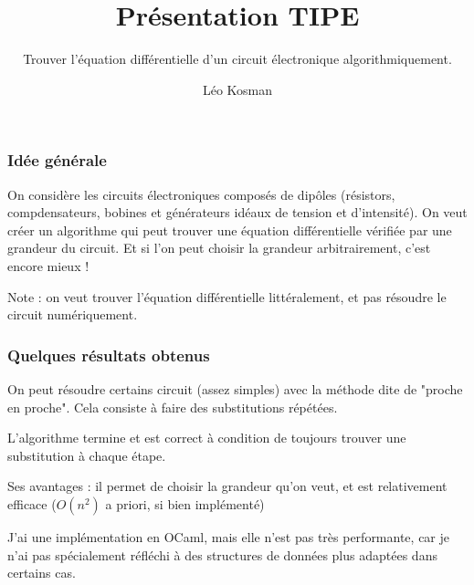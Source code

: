 \documentclass{beamer}
\title{Présentation TIPE}
\subtitle{Trouver l'équation différentielle d'un circuit électronique
algorithmiquement.}
\author{Léo Kosman}
\institute{MP2I \textemdash{} Lycée Thiers}
\date{}
\begin{document}
    \begin{frame}
        \titlepage
    \end{frame}

    \begin{frame}
        \frametitle {Idée générale}

        On considère les circuits électroniques composés de dipôles (résistors,
        compdensateurs, bobines et générateurs idéaux de tension et
        d'intensité). 
        \vspace{10}
        \pause
        On veut créer un algorithme qui peut trouver une équation différentielle
        vérifiée par une grandeur du circuit. Et si l'on peut choisir la
        grandeur arbitrairement, c'est encore mieux !
        \vspace{10}
        
        \pause
        Note : on veut trouver l'équation différentielle littéralement, et pas
        résoudre le circuit numériquement.
    \end{frame}

    \begin{frame}
        \frametitle{Quelques résultats obtenus}

        On peut résoudre certains circuit (assez simples) avec la méthode dite
        de "proche en proche". Cela consiste à faire des substitutions répétées.
        \vspace{4}
    
        \pause
        L'algorithme termine et est correct à condition de toujours trouver une
        substitution à chaque étape.
        
        
        \pause
        Ses avantages : il permet de choisir la grandeur qu'on veut, et est
        relativement efficace ($O(n^2)$ a priori, si bien implémenté)
        \vspace{4}

        \pause
        J'ai une implémentation en OCaml, mais elle n'est pas très performante,
        car je n'ai pas spécialement réfléchi à des structures de données plus
        adaptées dans certains cas.
        \vspace{4}

    \end{frame}
    
\end{document}
